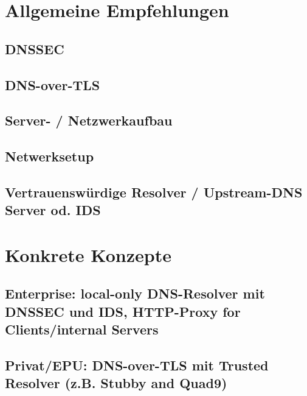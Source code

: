 \section{Allgemeine Empfehlungen}

\subsection{DNSSEC}

\subsection{DNS-over-TLS}
\subsection{Server- / Netzwerkaufbau}
\subsection{Netwerksetup}
\subsection{Vertrauenswürdige Resolver / Upstream-DNS Server od. IDS}


\section{Konkrete Konzepte}

\subsection{Enterprise: local-only DNS-Resolver mit DNSSEC und IDS, HTTP-Proxy for Clients/internal Servers}

\subsection{Privat/EPU: DNS-over-TLS  mit Trusted Resolver (z.B. Stubby and Quad9)}